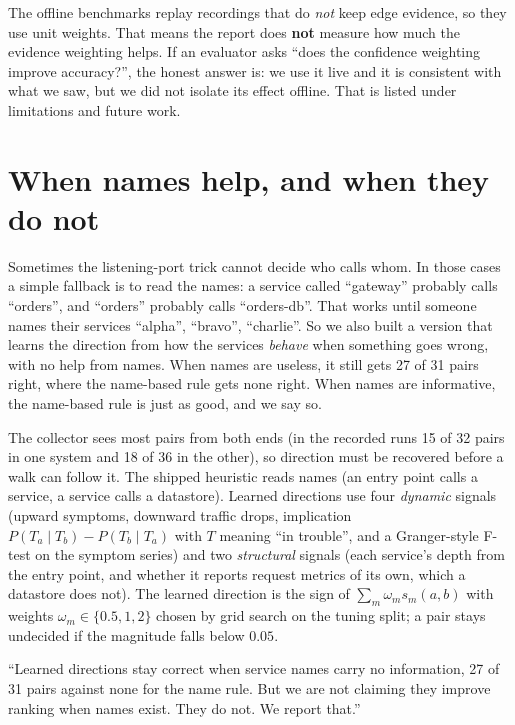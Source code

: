 \begin{warnbox}
The offline benchmarks replay recordings that do \emph{not} keep edge evidence, so they use unit weights. That means the report does \textbf{not} measure how much the evidence weighting helps. If an evaluator asks ``does the confidence weighting improve accuracy?'', the honest answer is: we use it live and it is consistent with what we saw, but we did not isolate its effect offline. That is listed under limitations and future work.
\end{warnbox}

\section{When names help, and when they do not}
\begin{simplebox}
Sometimes the listening-port trick cannot decide who calls whom. In those cases a simple fallback is to read the names: a service called ``gateway'' probably calls ``orders'', and ``orders'' probably calls ``orders-db''. That works until someone names their services ``alpha'', ``bravo'', ``charlie''. So we also built a version that learns the direction from how the services \emph{behave} when something goes wrong, with no help from names. When names are useless, it still gets 27 of 31 pairs right, where the name-based rule gets none right. When names are informative, the name-based rule is just as good, and we say so.
\end{simplebox}

\begin{techbox}
The collector sees most pairs from both ends (in the recorded runs 15 of 32 pairs in one system and 18 of 36 in the other), so direction must be recovered before a walk can follow it. The shipped heuristic reads names (an entry point calls a service, a service calls a datastore). Learned directions use four \emph{dynamic} signals (upward symptoms, downward traffic drops, implication $P(T_a\mid T_b)-P(T_b\mid T_a)$ with $T$ meaning ``in trouble'', and a Granger-style F-test on the symptom series) and two \emph{structural} signals (each service's depth from the entry point, and whether it reports request metrics of its own, which a datastore does not). The learned direction is the sign of $\sum_m\omega_m s_m(a,b)$ with weights $\omega_m\in\{0.5,1,2\}$ chosen by grid search on the tuning split; a pair stays undecided if the magnitude falls below $0.05$.
\end{techbox}

\begin{saybox}
``Learned directions stay correct when service names carry no information, 27 of 31 pairs against none for the name rule. But we are not claiming they improve ranking when names exist. They do not. We report that.''
\end{saybox}

